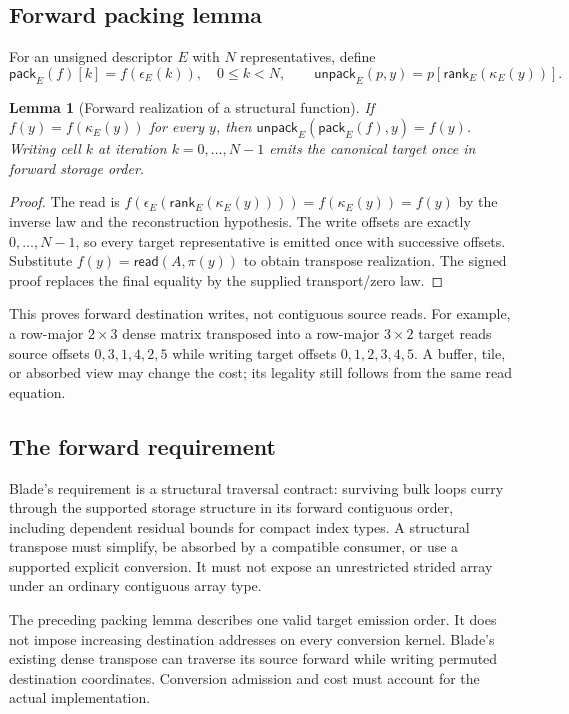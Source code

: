 \documentclass[11pt]{article}
\newtheorem{lemma}[theorem]{Lemma}
\newcommand{\rd}{\mathsf{read}}
\begin{document}
\subsection{Forward packing lemma}
For an unsigned descriptor $E$ with $N$ representatives, define
\[
 \mathsf{pack}_E(f)[k]=f(\epsilon_E(k)),\quad 0\le k<N,
 \qquad
 \mathsf{unpack}_E(p,y)=p[\mathsf{rank}_E(\kappa_E(y))].
\]
\begin{lemma}[Forward realization of a structural function]
If $f(y)=f(\kappa_E(y))$ for every $y$, then
$\mathsf{unpack}_E(\mathsf{pack}_E(f),y)=f(y)$.
Writing cell $k$ at iteration $k=0,\ldots,N-1$ emits the canonical target once in forward storage order.
\end{lemma}
\begin{proof}
The read is
$f(\epsilon_E(\mathsf{rank}_E(\kappa_E(y))))=f(\kappa_E(y))=f(y)$
by the inverse law and the reconstruction hypothesis. The write offsets are exactly $0,\ldots,N-1$, so every target representative is emitted once with successive offsets. Substitute $f(y)=\rd(A,\pi(y))$ to obtain transpose realization. The signed proof replaces the final equality by the supplied transport/zero law.
\end{proof}
This proves forward destination writes, not contiguous source reads. For example, a row-major $2\times3$ dense matrix transposed into a row-major $3\times2$ target reads source offsets $0,3,1,4,2,5$ while writing target offsets $0,1,2,3,4,5$. A buffer, tile, or absorbed view may change the cost; its legality still follows from the same read equation.

\subsection{The forward requirement}
Blade's requirement is a structural traversal contract: surviving bulk loops
curry through the supported storage structure in its forward contiguous order,
including dependent residual bounds for compact index types. A structural
transpose must simplify, be absorbed by a compatible consumer, or use a
supported explicit conversion. It must not expose an unrestricted strided
array under an ordinary contiguous array type.

The preceding packing lemma describes one valid target emission order. It
does not impose increasing destination addresses on every conversion kernel.
Blade's existing dense transpose can traverse its source forward while writing
permuted destination coordinates. Conversion admission and cost must account
for the actual implementation.
\end{document}
